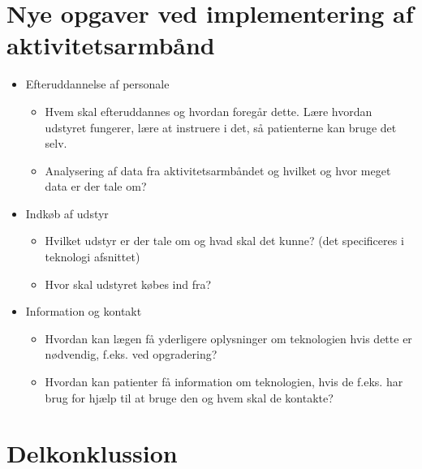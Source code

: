 \section{Nye opgaver ved implementering af aktivitetsarmbånd}
\begin{itemize}
\item Efteruddannelse af personale
\begin{itemize}
\item Hvem skal efteruddannes og hvordan foregår dette. Lære hvordan udstyret fungerer, lære at instruere i det, så patienterne kan bruge det selv.
\item Analysering af data fra aktivitetsarmbåndet og hvilket og hvor meget data er der tale om? 
\end{itemize}
\item Indkøb af udstyr
\begin{itemize}
\item Hvilket udstyr er der tale om og hvad skal det kunne? (det specificeres i teknologi afsnittet)
\item Hvor skal udstyret købes ind fra?
\end{itemize}
\item Information og kontakt
\begin{itemize}
\item Hvordan kan lægen få yderligere oplysninger om teknologien hvis dette er nødvendig, f.eks. ved opgradering? 
\item Hvordan kan patienter få information om teknologien, hvis de f.eks. har brug for hjælp til at bruge den og hvem skal de kontakte?
\end{itemize}
\end{itemize}

\section{Delkonklussion}

